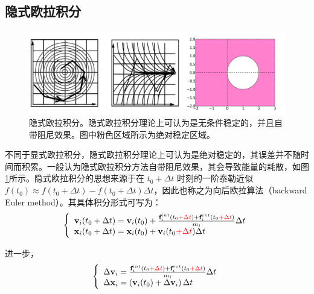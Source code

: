 \subsection{隐式欧拉积分}
\label{implicit_euler_method}

\begin{figure}[!htb]
  \centering
  \captionsetup{justification=centering}
  \includegraphics[width=\linewidth]{chap/image/implicit_method}

  \caption{\label{implicit_method}
           隐式欧拉积分。隐式欧拉积分理论上可认为是无条件稳定的，并且自带阻尼效果。图中粉色区域所示为绝对稳定区域。
          }
\end{figure}

不同于显式欧拉积分，隐式欧拉积分理论上可认为是绝对稳定的，其误差并不随时间而积累。一般认为隐式欧拉积分方法自带阻尼效果，其会导致能量的耗散，如图\ref{implicit_method}所示。隐式欧拉积分的思想来源于在 $t_0 + \Delta t$ 时刻的一阶泰勒近似$f(t_0) \approx f(t_0 + \Delta t) - \dot{f}(t_0 + \Delta t)\Delta t$，因此也称之为向后欧拉算法（backward Euler method）。其具体积分形式可写为：
\begin{equation}
\left\{ \begin{array}{l}
\textbf{v}_i(t_0+\Delta t) = \textbf{v}_i(t_0)+\frac{\textbf{f}_i^{int}(t_0 \textcolor{red}{+ \Delta t}) + \textbf{f}_i^{ext}(t_0 \textcolor{red}
                                  {+ \Delta t})}{m_i}\Delta t\\
\textbf{x}_i(t_0+\Delta t) = \textbf{x}_i(t_0)+\textbf{v}_i(t_0 \textcolor{red}{ + \Delta t})\Delta t
\end{array} \right.
\end{equation}

进一步，
\begin{equation}
\label{eqa25}
\left\{ \begin{array}{l}
\Delta \textbf{v}_i = \frac{\textbf{f}_i^{int}(t_0 \textcolor{red}{+ \Delta t}) + \textbf{f}_i^{ext}(t_0 \textcolor{red}
                                  {+ \Delta t})}{m_i}\Delta t\\
\Delta \textbf{x}_i = \left(\textbf{v}_i(t_0) + \Delta \textbf{v}_i\right)\Delta t
\end{array} \right.
\end{equation}

